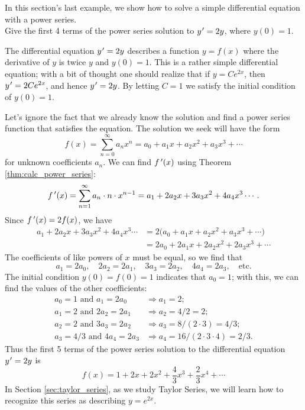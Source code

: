 In this section's last example, we show how to solve a simple differential equation with a power series.\\

{Give the first 4 terms of the power series solution to $y\hskip.75pt' = 2y$, where $y(0) = 1$.
}
{The differential equation $y\hskip.75pt' = 2y$ describes a function $y=f(x)$ where the derivative of $y$ is twice $y$ and $y(0)=1$. This is a rather simple differential equation; with a bit of thought one should realize that if $y=Ce^{2x}$, then $y\hskip.75pt' = 2Ce^{2x}$, and hence $y\hskip.75pt' = 2y$. By letting $C=1$ we satisfy the initial condition of $y(0)=1$.

Let's ignore the fact that we already know the solution and find a power series function that satisfies the equation. The solution we seek will have the form
$$f(x)  = \sum_{n=0}^\infty a_nx^n = a_0+a_1x+a_2x^2+a_3x^3+\cdots$$
for unknown coefficients $a_n$. We can find $f\,'(x)$ using Theorem \ref{thm:calc_power_series}:
$$f\,'(x) = \sum_{n=1}^\infty a_n\cdot n\cdot x^{n-1} = a_1+2a_2x+3a_3x^2+4a_4x^3\cdots.$$
Since $f\,'(x) = 2f(x)$, we have
\begin{align*}
a_1+2a_2x+3a_3x^2+4a_4x^3\cdots &= 2\big(a_0+a_1x+a_2x^2+a_3x^3+\cdots\big)\\
			&=2a_0+2a_1x+2a_2x^2+2a_3x^3+\cdots
\end{align*}
The coefficients of like powers of $x$ must be equal, so we find that
$$a_1 = 2a_0,\quad 2a_2 = 2a_1,\quad 3a_3 = 2a_2,\quad 4a_4 = 2a_3,\quad \text{etc.}$$
The initial condition $y(0) = f(0) = 1$ indicates that $a_0 = 1$; with this, we can find the values of the other coefficients:
\begin{align*}
a_0 = 1 \text{ and } a_1=2a_0 &\Rightarrow a_1 = 2;\\
a_1 = 2 \text{ and } 2a_2 = 2a_1 &\Rightarrow a_2=4/2 =2;\\
a_2=2 \text{ and } 3a_3 = 2a_2 &\Rightarrow a_3=8/(2\cdot3)=4/3;\\
a_3=4/3 \text{ and } 4a_4 = 2a_3 &\Rightarrow a_4 =16/(2\cdot3\cdot4)= 2/3. 
\end{align*}
Thus the first 5 terms of the power series solution to the differential equation $y\hskip.75pt'=2y$ is 
$$f(x) = 1+ 2x+2x^2 + \frac43x^3+\frac23x^4+\cdots$$
In Section \ref{sec:taylor_series}, as we study Taylor Series, we will learn how to recognize this series as describing $y=e^{2x}$. 
}\\

